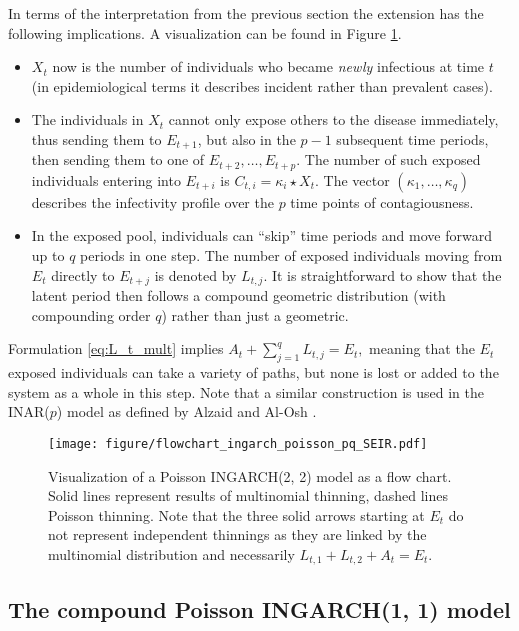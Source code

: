 \documentclass{article}
\begin{document}
In terms of the interpretation from the previous section the extension has the following implications. A visualization can be found in Figure \ref{fig:ingarch_flowchart_poisson_pq}.
\begin{itemize}
\item $X_t$ now is the number of individuals who became \textit{newly} infectious at time $t$ (in epidemiological terms it describes incident rather than prevalent cases).
\item The individuals in $X_t$ cannot only expose others to the disease immediately, thus sending them to $E_{t + 1}$, but also in the $p - 1$ subsequent time periods, then sending them to one of $E_{t + 2}, \dots, E_{t + p}$. The number of such exposed individuals entering into $E_{t + i}$ is $C_{t, i} = \kappa_i \star X_t$. The vector $(\kappa_1, \dots, \kappa_q)$ describes the infectivity profile over the $p$ time points of contagiousness.
\item In the exposed pool, individuals can ``skip'' time periods and move forward up to $q$ periods in one step. The number of exposed individuals moving from $E_t$ directly to $E_{t + j}$ is denoted by $L_{t, j}$. It is straightforward to show that the latent period then follows a compound geometric distribution (with compounding order $q$) rather than just a geometric.
\end{itemize}
Formulation \eqref{eq:L_t_mult} implies $A_t + \sum_{j = 1}^q L_{t, j} = E_t,$ meaning that the $E_t$ exposed individuals can take a variety of paths, but none is lost or added to the system as a whole in this step. Note that a similar construction is used in the INAR($p$) model as defined by Alzaid and Al-Osh \cite{Alzaid1990}.

\begin{figure}[h!]
\center
\texttt{[image: figure/flowchart\_ingarch\_poisson\_pq\_SEIR.pdf]}
\caption{Visualization of a Poisson INGARCH(2, 2) model as a flow chart. Solid lines represent results of multinomial thinning, dashed lines Poisson thinning. Note that the three solid arrows starting at $E_t$ do not represent independent thinnings as they are linked by the multinomial distribution and necessarily $L_{t, 1} + L_{t, 2} + A_t = E_t$.}
\label{fig:ingarch_flowchart_poisson_pq}

\end{figure}


\subsection{The compound Poisson INGARCH(1, 1) model}
\label{subsec:compound}
\end{document}
